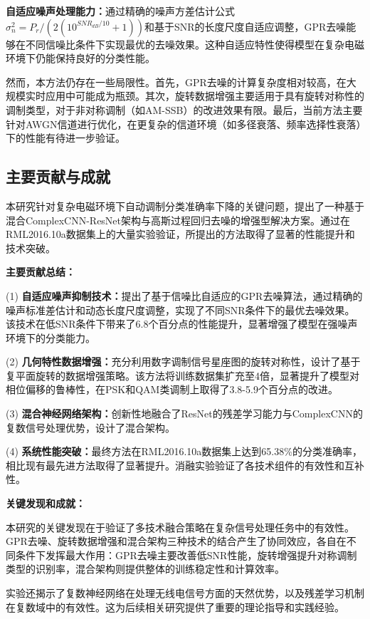 \documentclass[conference]{IEEEtran}
\begin{document}
\textbf{自适应噪声处理能力：}通过精确的噪声方差估计公式$\sigma_n^2 = P_r/(2(10^{SNR_{dB}/10} + 1))$和基于SNR的长度尺度自适应调整，GPR去噪能够在不同信噪比条件下实现最优的去噪效果。这种自适应特性使得模型在复杂电磁环境下仍能保持良好的分类性能。

然而，本方法仍存在一些局限性。首先，GPR去噪的计算复杂度相对较高，在大规模实时应用中可能成为瓶颈。其次，旋转数据增强主要适用于具有旋转对称性的调制类型，对于非对称调制（如AM-SSB）的改进效果有限。最后，当前方法主要针对AWGN信道进行优化，在更复杂的信道环境（如多径衰落、频率选择性衰落）下的性能有待进一步验证。

\subsection{主要贡献与成就}

本研究针对复杂电磁环境下自动调制分类准确率下降的关键问题，提出了一种基于混合ComplexCNN-ResNet架构与高斯过程回归去噪的增强型解决方案。通过在RML2016.10a数据集上的大量实验验证，所提出的方法取得了显著的性能提升和技术突破。

\textbf{主要贡献总结：}

(1) \textbf{自适应噪声抑制技术：}提出了基于信噪比自适应的GPR去噪算法，通过精确的噪声标准差估计和动态长度尺度调整，实现了不同SNR条件下的最优去噪效果。该技术在低SNR条件下带来了6.8个百分点的性能提升，显著增强了模型在强噪声环境下的分类能力。

(2) \textbf{几何特性数据增强：}充分利用数字调制信号星座图的旋转对称性，设计了基于复平面旋转的数据增强策略。该方法将训练数据集扩充至4倍，显著提升了模型对相位偏移的鲁棒性，在PSK和QAM类调制上取得了3.8-5.9个百分点的改进。

(3) \textbf{混合神经网络架构：}创新性地融合了ResNet的残差学习能力与ComplexCNN的复数信号处理优势，设计了混合架构。

(4) \textbf{系统性能突破：}最终方法在RML2016.10a数据集上达到65.38\%的分类准确率，相比现有最先进方法取得了显著提升。消融实验验证了各技术组件的有效性和互补性。

\textbf{关键发现和成就：}

本研究的关键发现在于验证了多技术融合策略在复杂信号处理任务中的有效性。GPR去噪、旋转数据增强和混合架构三种技术的结合产生了协同效应，各自在不同条件下发挥最大作用：GPR去噪主要改善低SNR性能，旋转增强提升对称调制类型的识别率，混合架构则提供整体的训练稳定性和计算效率。

实验还揭示了复数神经网络在处理无线电信号方面的天然优势，以及残差学习机制在复数域中的有效性。这为后续相关研究提供了重要的理论指导和实践经验。
\end{document}
